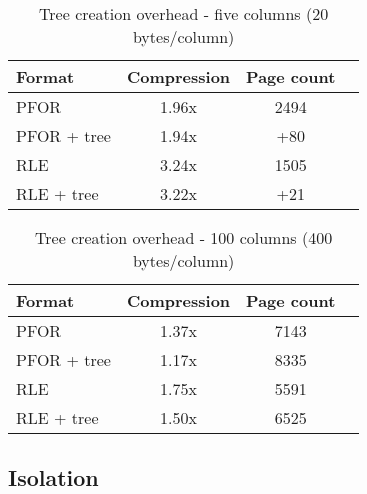 \documentclass{vldb}
\begin{document}
\begin{table}
\caption{Tree creation overhead - five columns (20 bytes/column)}
\centering
\label{table:treeCreation}
\begin{tabular}{|l|c|c|c|} \hline
Format     & Compression & Page count \\ \hline %
PFOR        & 1.96x       & 2494       \\ \hline %
PFOR + tree & 1.94x       & +80        \\ \hline %
RLE        & 3.24x       & 1505 \\ \hline %
RLE + tree & 3.22x       & +21        \\  %
\hline\end{tabular}
\end{table}
\begin{table}
\caption{Tree creation overhead - 100 columns (400 bytes/column)}
\centering
\label{table:treeCreationTwo}
\begin{tabular}{|l|c|c|c|} \hline
Format     & Compression & Page count \\ \hline %
PFOR        & 1.37x       & 7143       \\ \hline %
PFOR + tree & 1.17x       & 8335        \\ \hline %
RLE        & 1.75x       & 5591 \\ \hline %
RLE + tree & 1.50x       & 6525        \\  %

\hline\end{tabular}
\end{table}


\subsection{Isolation}
\label{sec:isolation}
\end{document}
